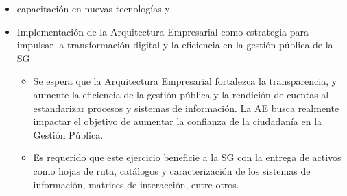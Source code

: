 \documentclass[
	a4paper, %
	12pt, %
]{include/CSSullivanBusinessReport}
\def\tightlist{}
\begin{document}
\begin{itemize}
  \begin{itemize}
  \tightlist
  \item
    Se busca la consolidación de herramientas, canales e información
    para fortalecer la oferta y celeridad de servicios y la
    participación ciudadana. Esto incluye el seguimiento a canales de
    atención virtual como SuperCADE Virtual, chat, chat-Bot y (video)
    llamadas de la línea 195.
  \item
    Se busca optimizar los procesos de recolección, análisis y
    divulgación de la información mediante la implementación de sistemas
    de información que incluyan la automatización de la recolección de
    datos y el uso de herramientas analíticas.
  \item
    Es destacado que el Distrito unifica en el portal Bogotá su oferta
    de trámites y servicios, como el realizar pagos en línea (no
    tributarios) y agendamiento de citas en la RedCADE desde casa;
    esfuerzo que debe continuar y extenderse a los más de 1.400 trámites
    y servicios. Esto representa una mejora significativa en la
    accesibilidad y eficiencia de los servicios digitales para la
    ciudadanía.
  \end{itemize}
\item
  capacitación en nuevas tecnologías y
\item
  Implementación de la Arquitectura Empresarial como estrategia para
  impulsar la transformación digital y la eficiencia en la gestión
  pública de la SG

  \begin{itemize}
  \tightlist
  \item
    Se espera que la Arquitectura Empresarial fortalezca la
    transparencia, y aumente la eficiencia de la gestión pública y la
    rendición de cuentas al estandarizar procesos y sistemas de
    información. La AE busca realmente impactar el objetivo de aumentar
    la confianza de la ciudadanía en la Gestión Pública.
  \item
    Es requerido que este ejercicio beneficie a la SG con la entrega de
    activos como hojas de ruta, catálogos y caracterización de los
    sistemas de información, matrices de interacción, entre otros.
  \end{itemize}
\end{itemize}
\end{document}
